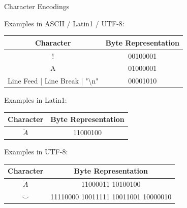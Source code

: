 \documentclass[
	11pt, 
]{beamer}
\begin{document}
\begin{frame}{Character Encodings}

Examples in ASCII / Latin1 / UTF-8:

\begin{center}
\vspace{.1cm}
\begin{tabular}{|c|c|}
\hline
Character & Byte Representation \\
\hline
! & 00100001 \\
A & 01000001 \\
Line Feed | Line Break | "\textbackslash{}n" & 00001010 \\
\hline
\end{tabular}
\end{center}

Examples in Latin1:

\begin{center}
\vspace{.1cm}
\renewcommand{\arraystretch}{1.3}
\begin{tabular}{|c|c|}
\hline
Character & Byte Representation \\
\hline
$\ddot{A}$ & 11000100 \\
\hline
\end{tabular}
\end{center}

Examples in UTF-8:

\begin{center}
\vspace{.1cm}
\renewcommand{\arraystretch}{1.3}
\begin{tabular}{|c|c|}
\hline
Character & Byte Representation \\
\hline
$\ddot{A}$ & 11000011 10100100 \\
$\ddot\smile$ & 11110000 10011111 10011001 10000010 \\
\hline
\end{tabular}
\end{center}

    
\end{frame}

\end{document}

